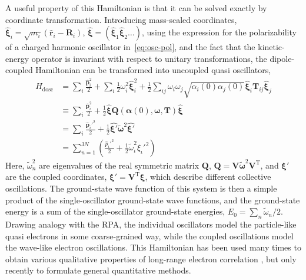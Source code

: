 A useful property of this Hamiltonian is that it can be solved exactly by coordinate transformation.
Introducing mass-scaled coordinates, $\hat{\boldsymbol\xi}_i=\sqrt{m_i}(\mathbf{\hat r}_i-\mathbf R_i)$, $\hat{\boldsymbol\xi}=(\hat{\boldsymbol\xi}_1\hat{\boldsymbol\xi}_2\ldots)$, using the expression for the polarizability of a charged harmonic oscillator in~\eqref{eq:osc-pol}, and the fact that the kinetic-energy operator is invariant with respect to unitary transformations, the dipole-coupled Hamiltonian can be transformed into uncoupled quasi oscillators,
\begin{equation}
\begin{aligned}
  \hat H_\text{dosc}&=\sum_i\frac{\mathbf{\hat p}_i^2}2+\sum_i\frac12\omega_i^2\hat{\boldsymbol\xi}_i^2+\frac12\sum_{ij}\omega_i\omega_j\sqrt{\alpha_i(0)\alpha_j(0)}\hat{\boldsymbol\xi}_i\mathbf T_{ij}\hat{\boldsymbol\xi}_j \\
  &\equiv\sum_i\frac{\mathbf{\hat p}_i^2}2+\frac12\hat{\boldsymbol\xi}\mathbf Q(\boldsymbol\alpha(0),\boldsymbol\omega,\mathbf T)\hat{\boldsymbol\xi} \\
  &=\sum_i\frac{\mathbf{\hat p}_i'^2}2+\frac12\hat{\boldsymbol\xi'}\tilde{\boldsymbol\omega}^2\hat{\boldsymbol\xi'} \\
  &=\sum_{n=1}^{3N}\left(\frac{\hat p_\iota'^2}2+\frac12\tilde\omega_\iota^2\hat\xi_\iota'^2\right)
\end{aligned}
\label{eq:dosc-hamil}
\end{equation}
Here, $\tilde\omega_n^2$ are eigenvalues of the real symmetric matrix $\mathbf Q$, $\mathbf Q=\mathbf V\tilde{\boldsymbol\omega}^2\mathbf V^\mathrm T$, and $\boldsymbol\xi'$ are the coupled coordinates, $\boldsymbol\xi'=\mathbf V^\mathrm T\boldsymbol\xi$, which describe different collective oscillations.
The ground-state wave function of this system is then a simple product of the single-oscillator ground-state wave functions, and the ground-state energy is a sum of the single-oscillator ground-state energies, $E_0=\sum_n\tilde\omega_n/2$.
Drawing analogy with the RPA, the individual oscillators model the particle-like quasi electrons in some coarse-grained way, while the coupled oscillations model the wave-like electron oscillations.
This Hamiltonian has been used many times to obtain various qualitative properties of long-range electron correlation \citep{BadeJCP57,BadeJCP57a,MahanJCP65,LucasP67,RenneCPL67,DonchevJCP06}, but only recently to formulate general quantitative methods.

